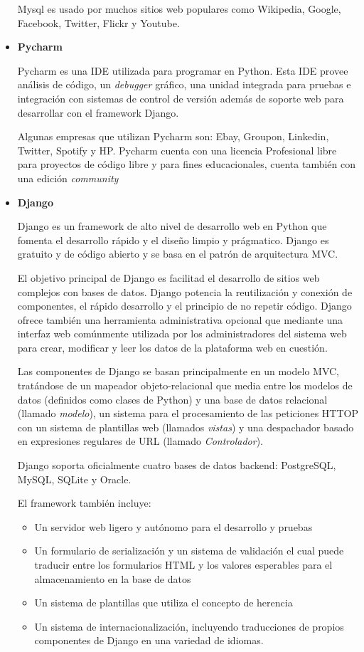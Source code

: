 \begin{itemize}
		Mysql es usado por muchos sitios web populares como Wikipedia, Google, Facebook, Twitter, Flickr y Youtube. 
		
	\item \textbf{Pycharm}
	
		Pycharm \cite{pycharmWeb} es una IDE utilizada para programar en Python. Esta IDE provee análisis de código, un \emph{debugger} gráfico, una unidad integrada para pruebas e integración con sistemas de control de versión además de soporte web para desarrollar con el framework Django.
		
		Algunas empresas que utilizan Pycharm son: Ebay, Groupon, Linkedin, Twitter, Spotify y HP. Pycharm cuenta con una licencia Profesional libre para proyectos de código libre y para fines educacionales, cuenta también con una edición \emph{community}
	
		
	\item \textbf{Django}
	
	Django \cite{djangoWeb} es un framework de alto nivel de desarrollo web en Python que fomenta el desarrollo rápido y el diseño limpio y prágmatico. Django es gratuito y de código abierto y se basa en el patrón de arquitectura MVC.
	
	El objetivo principal de Django es facilitad el desarrollo de sitios web complejos con bases de datos. Django potencia la reutilización y conexión de componentes, el rápido desarrollo y el principio de no repetir código. Django ofrece también una herramienta administrativa opcional que mediante una interfaz web comúnmente utilizada por los administradores del sistema web para crear, modificar y leer los datos de la plataforma web en cuestión. 
	
	Las componentes de Django se basan principalmente en un modelo MVC, tratándose de un mapeador objeto-relacional que media entre los modelos de datos (definidos como clases de Python) y una base de datos relacional (llamado \emph{modelo}), un sistema para el procesamiento de las peticiones HTTOP con un sistema de plantillas web (llamados \emph{vistas}) y una despachador basado en expresiones regulares de URL (llamado \emph{Controlador}).
	
	Django soporta oficialmente cuatro bases de datos backend: PostgreSQL, MySQL, SQLite y Oracle.
	
	El framework también incluye:
	
	\begin{itemize}
		\item Un servidor web ligero y autónomo para el desarrollo y pruebas
		\item Un formulario de serialización y un sistema de validación el cual puede traducir entre los formularios HTML y los valores esperables para el almacenamiento en la base de datos
		\item Un sistema de plantillas que utiliza el concepto de herencia
		\item Un sistema de internacionalización, incluyendo traducciones de propios componentes de Django en una variedad de idiomas.
	\end{itemize}
	

\end{itemize}
